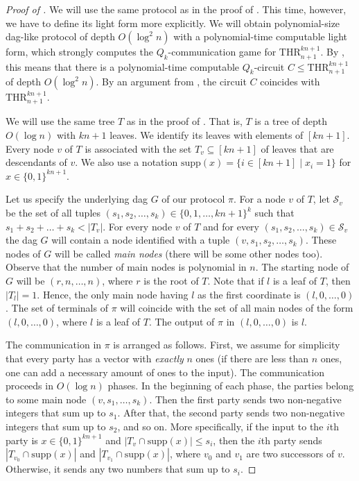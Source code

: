 \documentclass{toc}
\def\THR{\mathrm{THR}}
\begin{document}
\begin{proof}[Proof of ]

We will use the same protocol as in the proof of . This time, however, we have to define its light form more explicitly.
We will obtain 
%
polynomial-size dag-like protocol 
of depth $O(\log^2 n)$  %
with a polynomial-time computable light form, which strongly computes the $Q_k$-communication game for $\THR^{kn + 1}_{n + 1}$. By , this means that there is a polynomial-time computable 
%
%
%
$Q_k$-circuit $C\le \THR^{kn + 1}_{n + 1}$
of depth $O(\log^2 n)$.  %
By an argument from , the circuit $C$ coincides with $\THR^{kn + 1}_{n + 1}$. 


We will use the same tree $T$ as in the proof of . That is, $T$ is 
%
a tree of depth $O(\log n)$  %
with $kn + 1$ leaves. We identify its leaves with elements of $[kn + 1]$. Every node $v$ of $T$ is associated with the set $T_v\subseteq[kn + 1]$ of leaves that are descendants of $v$. We also use a notation $\mathrm{supp}(x) = \{i\in[kn+1]\mid x_i = 1\}$ for $x\in\{0, 1\}^{kn+1}$.

Let us specify the underlying dag $G$ of our protocol $\pi$.
 For a node $v$ of $T$, let $\mathcal{S}_v$ be the set of all tuples $(s_1, s_2, \ldots, s_k) \in \{0, 1, \ldots, kn + 1\}^k$ such that $s_1 + s_2 + \ldots + s_k < |T_v|$. For every node $v$ of $T$ and for every $(s_1, s_2, \ldots, s_k) \in \mathcal{S}_v$ the dag $G$ will contain a node identified with a tuple $(v, s_1, s_2, \ldots, s_k)$. These nodes of $G$ will be called \emph{main nodes} (there will be some other nodes too). Observe that the number of main nodes is polynomial in $n$. The starting node of $G$ will be $(r, n, \ldots, n)$, where $r$ is the root of $T$. Note that if $l$ is a leaf of $T$, then $|T_l| = 1$. Hence, the only main node having $l$ as the first coordinate is $(l, 0, \ldots, 0)$. The set of terminals of $\pi$ will coincide with the set of all main nodes of the form $(l, 0, \ldots, 0)$, where $l$ is a leaf of $T$. The output of $\pi$ in $(l, 0, \ldots, 0)$ is $l$. 

The communication in $\pi$ is arranged as follows. First, we assume for simplicity that every party has a vector with \emph{exactly} $n$ ones (if there are less than $n$ ones, one can add a necessary amount of ones to the input). The communication proceeds in $O(\log n)$ phases.
 In the beginning of each phase, the parties belong to some main node $(v, s_1, \ldots, s_k)$. Then the first party sends two non-negative integers that sum up to $s_1$. After that, the second party sends two non-negative integers that sum up to $s_2$, and so on. More specifically, if the input to the $i$th party is $x\in\{0, 1\}^{kn + 1}$ and $|T_v\cap\mathrm{supp}(x)| \le s_i$, then the $i$th party sends $|T_{v_0}\cap\mathrm{supp}(x)|$ and $|T_{v_1}\cap\mathrm{supp}(x)|$,  where $v_0$ and $v_1$ are two successors of $v$. Otherwise, it sends any two numbers that sum up to $s_i$.


\end{proof}
\end{document}

